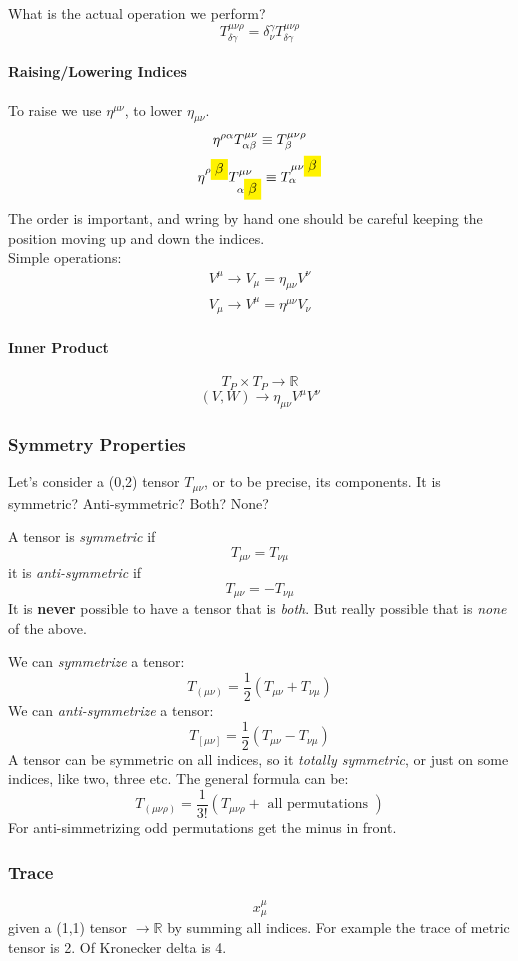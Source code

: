 What is the actual operation we perform?
\[
T^{\mu \nu \rho }_{\delta  \gamma } = \delta^{\gamma }_{\nu } T^{\mu  \nu \rho }_{\delta \gamma }
\]
\paragraph{Raising/Lowering Indices}
To raise we use $\eta^{\mu \nu }$, to lower $\eta_{\mu \nu }$.
\begin{gather*}
\eta^{\rho \alpha } T^{\mu \nu }_{\alpha \beta } \equiv T^{\mu  \nu  \rho }_{ \beta  } \\
\eta^{\rho \colorbox{yellow}{$ \beta   $} } T^{\mu \nu }_{\alpha \colorbox{yellow}{$ \beta   $} } \equiv T^{\mu \nu \colorbox{yellow}{$ \beta   $} }_{\alpha }
\end{gather*}
The order is important, and wring by hand one should be careful keeping the position moving up and down the indices. \\

Simple operations:
\begin{gather*}
V^{\mu } \to V_{\mu} = \eta_{\mu \nu } V^{\nu } \\
V_{\mu } \to V^{\mu } = \eta^{\mu \nu } V_{\nu }
\end{gather*}

\paragraph{Inner Product}
\[
	T_{P}\times T_{P} \to \mathbb{R}
\]
\[
	\left( V,W \right) \to \eta_{\mu \nu }V^{\mu }V^{\nu }
\]

\subsubsection{Symmetry Properties}
Let's consider a (0,2) tensor $T_{\mu \nu }$, or to be precise, its components.
It is symmetric? Anti-symmetric? Both? None?

A tensor is \emph{symmetric} if
\[
T_{\mu \nu } = T_{\nu  \mu }
\]
it is \emph{anti-symmetric} if
\[
T_{\mu  \nu } = - T_{\nu  \mu }
\]
It is \textbf{never} possible to have a tensor that is \emph{both}. But really possible that is \emph{none} of the above.

We can \emph{symmetrize} a tensor:
\[
T_{\left( \mu  \nu  \right)} = \frac{1}{2} \left( T_{\mu  \nu } + T_{\nu \mu } \right)
\]
We can \emph{anti-symmetrize} a tensor:
\[
	T_{[\mu  \nu ]} = \frac{1}{2} \left( T_{\mu \nu } - T_{\nu  \mu } \right)
\]
A tensor can be symmetric on all indices, so it \emph{totally symmetric}, or just on some indices, like two, three etc.
The general formula can be:
\[
T_{\left( \mu  \nu  \rho  \right)} = \frac{1}{3!} \left( T_{\mu  \nu  \rho } + \text{ all permutations } \right)
\]
For anti-simmetrizing odd permutations get the minus in front.

\subsubsection{Trace}
\[
x^{\mu }_{\mu }
\]
given a (1,1) tensor $\to \mathbb{R}$ by summing all indices.
For example the trace of metric tensor is 2.
Of Kronecker delta is 4.
